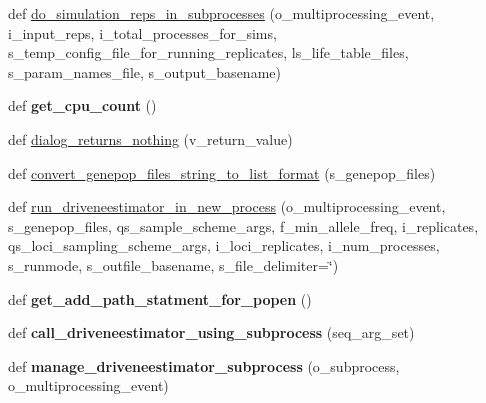\begin{DoxyCompactItemize}
\item 
def \hyperlink{namespacenegui_1_1pgutilities_a7dc2404b0e269d0b0848711c8271bb86}{do\+\_\+simulation\+\_\+reps\+\_\+in\+\_\+subprocesses} (o\+\_\+multiprocessing\+\_\+event, i\+\_\+input\+\_\+reps, i\+\_\+total\+\_\+processes\+\_\+for\+\_\+sims, s\+\_\+temp\+\_\+config\+\_\+file\+\_\+for\+\_\+running\+\_\+replicates, ls\+\_\+life\+\_\+table\+\_\+files, s\+\_\+param\+\_\+names\+\_\+file, s\+\_\+output\+\_\+basename)
\item 
def {\bfseries get\+\_\+cpu\+\_\+count} ()\hypertarget{namespacenegui_1_1pgutilities_a651d0e76f36897c5ca20e6d40d1a46a7}{}\label{namespacenegui_1_1pgutilities_a651d0e76f36897c5ca20e6d40d1a46a7}

\item 
def \hyperlink{namespacenegui_1_1pgutilities_aa839d4997d2bd2c15016c33cc7fce3b0}{dialog\+\_\+returns\+\_\+nothing} (v\+\_\+return\+\_\+value)
\item 
def \hyperlink{namespacenegui_1_1pgutilities_aed0f15b22462914445ffe1ec2a77cbc8}{convert\+\_\+genepop\+\_\+files\+\_\+string\+\_\+to\+\_\+list\+\_\+format} (s\+\_\+genepop\+\_\+files)
\item 
def \hyperlink{namespacenegui_1_1pgutilities_a177345979e44820072e37052d92bfd32}{run\+\_\+driveneestimator\+\_\+in\+\_\+new\+\_\+process} (o\+\_\+multiprocessing\+\_\+event, s\+\_\+genepop\+\_\+files, qs\+\_\+sample\+\_\+scheme\+\_\+args, f\+\_\+min\+\_\+allele\+\_\+freq, i\+\_\+replicates, qs\+\_\+loci\+\_\+sampling\+\_\+scheme\+\_\+args, i\+\_\+loci\+\_\+replicates, i\+\_\+num\+\_\+processes, s\+\_\+runmode, s\+\_\+outfile\+\_\+basename, s\+\_\+file\+\_\+delimiter=\char`\"{})
\item 
def {\bfseries get\+\_\+add\+\_\+path\+\_\+statment\+\_\+for\+\_\+popen} ()\hypertarget{namespacenegui_1_1pgutilities_a606a7615fe2e94332376016ce8abe372}{}\label{namespacenegui_1_1pgutilities_a606a7615fe2e94332376016ce8abe372}

\item 
def {\bfseries call\+\_\+driveneestimator\+\_\+using\+\_\+subprocess} (seq\+\_\+arg\+\_\+set)\hypertarget{namespacenegui_1_1pgutilities_a893dab54be58c2b407323ae6fee6c4ea}{}\label{namespacenegui_1_1pgutilities_a893dab54be58c2b407323ae6fee6c4ea}

\item 
def {\bfseries manage\+\_\+driveneestimator\+\_\+subprocess} (o\+\_\+subprocess, o\+\_\+multiprocessing\+\_\+event)\hypertarget{namespacenegui_1_1pgutilities_aa62ddf0928a977844669e59f5b4e3329}{}\label{namespacenegui_1_1pgutilities_aa62ddf0928a977844669e59f5b4e3329}


\end{DoxyCompactItemize}
